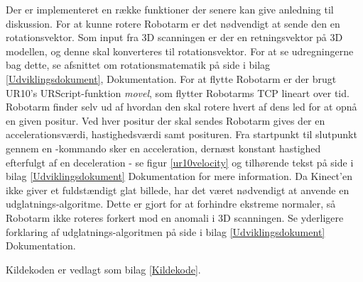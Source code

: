 Der er implementeret en række funktioner der senere kan give anledning til diskussion. 
For at kunne rotere Robotarm er det nødvendigt at sende den en rotationsvektor. Som input fra 3D scanningen er der en retningsvektor på 3D modellen, og denne skal konverteres til rotationsvektor. For at se udregningerne bag dette, se afsnittet om rotationsmatematik på side \pageref{rotationsmatematik} i bilag \ref{Udviklingsdokument}, Dokumentation.
\newline
For at flytte Robotarm er der brugt UR10's URScript-funktion \textit{movel}, som flytter Robotarms TCP lineart over tid. Robotarm finder selv ud af hvordan den skal rotere hvert af dens led for at opnå en given positur. Ved hver positur der skal sendes Robotarm gives der en accelerationsværdi, hastighedsværdi samt posituren. Fra startpunkt til slutpunkt gennem en -kommando sker en acceleration, dernæst konstant hastighed efterfulgt af en deceleration - se figur \ref{ur10velocity} og tilhørende tekst på side \pageref{ur10velocity} i bilag \ref{Udviklingsdokument} Dokumentation for mere information.
\newline
Da Kinect'en ikke giver et fuldstændigt glat billede, har det været nødvendigt at anvende en udglatnings-algoritme. Dette er gjort for at forhindre ekstreme normaler, så Robotarm ikke roteres forkert mod en anomali i 3D scanningen. Se yderligere forklaring af udglatnings-algoritmen på side \pageref{calculationlibraryafsnit} i bilag \ref{Udviklingsdokument} Dokumentation.

Kildekoden er vedlagt som bilag \ref{Kildekode}.
